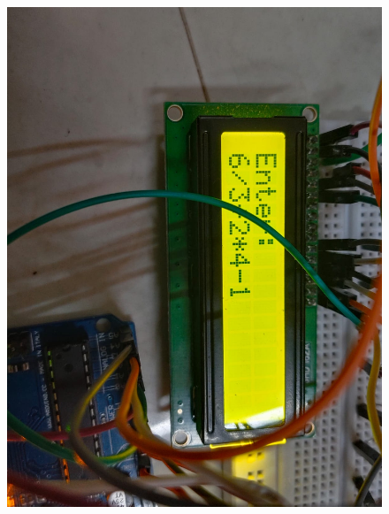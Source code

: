 \documentclass[journal]{IEEEtran}
\begin{document}
\begin{figure}[H]
        \centering
        \begin{minipage}{0.45\linewidth}
        \includegraphics[width=1.0\linewidth]{fig/dmas.jpeg}
        \label{fig:enter-label}
        \end{minipage}
        \hfill
        \begin{minipage}{0.45\linewidth}

\end{minipage}
\end{figure}
\end{document}
